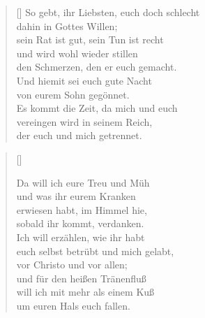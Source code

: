 \begin{multicols}{2}
\begin{verse}[\versewidth]
 So gebt, ihr Liebsten, euch doch schlecht\\
dahin in Gottes Willen;\\
sein Rat ist gut, sein Tun ist recht\\
und wird wohl wieder stillen\\
den Schmerzen, den er euch gemacht.\\
Und hiemit sei euch gute Nacht\\
von eurem Sohn gegönnet.\\
Es kommt die Zeit, da mich und euch\\
vereingen wird in seinem Reich,\\
der euch und mich getrennet.

\end{verse}
\end{multicols}

\begin{center}
\settowidth{\versewidth}{Der, vor dem die Welt erschrickt,}
\begin{verse}[\versewidth]


 Da will ich eure Treu und Müh\\
und was ihr eurem Kranken\\
erwiesen habt, im Himmel hie,\\
sobald ihr kommt, verdanken.\\
Ich will erzählen, wie ihr habt\\
euch selbst betrübt und mich gelabt,\\
vor Christo und vor allen;\\
und für den heißen Tränenfluß\\
will ich mit mehr als einem Kuß\\
um euren Hals euch fallen.
   
\end{verse}
\end{center}

